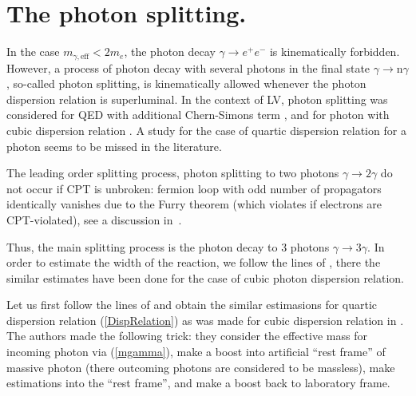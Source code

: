 \documentclass[12pt]{article}
\begin{document}
\section{The photon splitting.} 

In the case $m_{\gamma,\mathrm{eff}} < 2m_{e}$, the photon decay $\gamma \to e^+e^-$ is kinematically forbidden. However, a process of photon decay with several photons in the final state $\gamma \to \mbox{n}\gamma$, so-called photon splitting, is kinematically allowed whenever the photon dispersion relation is superluminal. In the context of LV, photon splitting was considered for QED with additional Chern-Simons term \cite{Adam:2002rg}, and for photon with cubic dispersion relation \cite{Gelmini:2005gy}. A study for the case of quartic dispersion relation for a photon seems to be missed in the literature. 

The leading order splitting process, photon splitting to two photons $\gamma \to 2 \gamma$ do not occur if CPT is unbroken: fermion loop with odd number of propagators identically vanishes due to the Furry theorem (which violates if electrons are CPT-violated), see a discussion   in~\cite{Liberati:2013xla}.

Thus, the main  splitting process is the photon decay to 3 photons  $\gamma \to 3\gamma$. In order to estimate the width of the reaction, we follow the lines of  \cite{Gelmini:2005gy}, there the similar estimates have been done for the case of cubic photon dispersion relation.


Let us first follow the lines of \cite{Gelmini:2005gy} and obtain the similar estimasions for quartic dispersion relation (\ref{DispRelation}) as was made for cubic dispersion relation in \cite{Gelmini:2005gy}. The authors made the following trick: they consider the effective mass for incoming photon via (\ref{mgamma}), make a boost into artificial ``rest frame'' of massive photon (there outcoming photons are considered to be massless), make estimations into the  ``rest frame'', and make a  boost back to laboratory frame.
\end{document}
